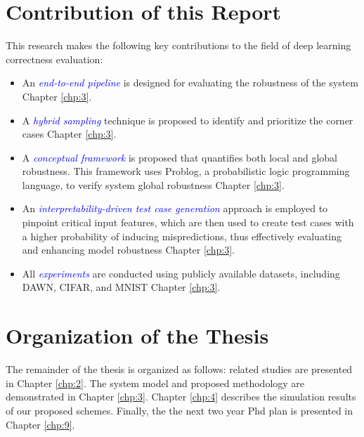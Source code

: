 \section{Contribution of this Report}

This research makes the following key contributions to the field of deep learning correctness evaluation:

\begin{itemize}
    \item An \textit{\textcolor{blue}{end-to-end pipeline}} is designed for evaluating the robustness of the system Chapter \ref{chp:3}.
    \item A \textit{\textcolor{blue}{hybrid sampling}} technique is proposed to identify and prioritize the corner cases Chapter \ref{chp:3}.
    \item A \textit{\textcolor{blue}{conceptual framework}} is proposed that quantifies both local and global robustness. This framework uses Problog, a probabilistic logic programming language, to verify system global robustness Chapter \ref{chp:3}. 
    \item An \textit{\textcolor{blue}{interpretability-driven test case generation}} approach is employed to pinpoint critical input features, which are then used to create test cases with a higher probability of inducing mispredictions, thus effectively evaluating and enhancing model robustness Chapter \ref{chp:3}.
    \item All \textit{\textcolor{blue}{experiments}} are conducted using publicly available datasets, including DAWN, CIFAR, and MNIST Chapter \ref{chp:3}.
\end{itemize}

\begin{center}
    \end{center}
\section{Organization of the Thesis}\hypertarget{organization of thesis}{}
The remainder of the thesis is organized as follows: related studies are presented in Chapter \ref{chp:2}. The system model and proposed methodology are demonstrated in Chapter \ref{chp:3}. Chapter \ref{chp:4} describes the simulation results of our proposed schemes. Finally, the the next two year Phd plan is presented in Chapter \ref{chp:9}.


\clearpage
